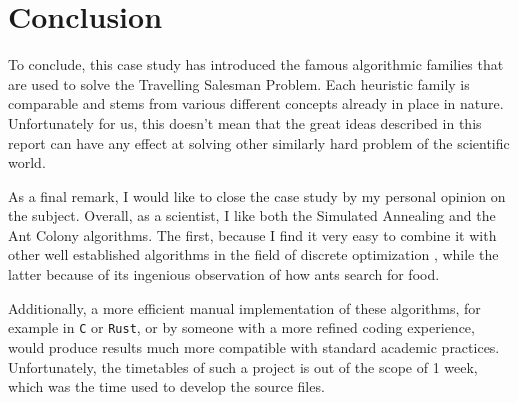 
\section{Conclusion}
\label{sec: conclusion}

To conclude, this case study has introduced the famous algorithmic families that are used to solve the Travelling Salesman Problem. Each heuristic family is comparable and stems from various different concepts already in place in nature. Unfortunately for us, this doesn't mean that the great ideas described in this report can have any effect at solving other similarly hard problem of the scientific world.

As a final remark, I would like to close the case study by my personal opinion on the subject. Overall, as a scientist, I like both the Simulated Annealing and the Ant Colony algorithms. The first, because I find it very easy to combine it with other well established algorithms in the field of discrete optimization \cite{ye2013improved}, while the latter because of its ingenious observation of how ants search for food.

Additionally, a more efficient manual implementation of these algorithms, for example in \texttt{C} or \texttt{Rust}, or by someone with a more refined coding experience, would produce results much more compatible with standard academic practices. Unfortunately, the timetables of such a project is out of the scope of 1 week, which was the time used to develop the source files.
